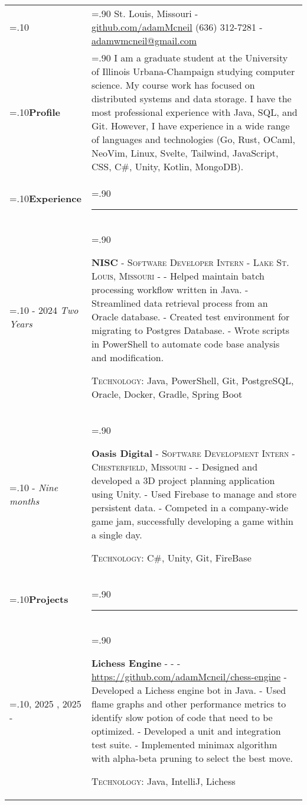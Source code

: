 \documentclass[10pt]{article}
\newcommand{\timeFrame}[3] {
  \if\relax\detokenize{#2}\relax
    #1
  \else
    #1 - #2
  \fi
  \newline
  \scriptsize \textit{#3}
}
\newcommand{\entry}[6] {
  \textbf{#1}
  \if\relax\detokenize{#2}\relax
  \else
       - \textsc{#2}
  \fi
  \if\relax\detokenize{#3}\relax
  \else
      - \textsc{#3}
  \fi
  \if\relax\detokenize{#4}\relax
  \else
      - \href{https://#4}{#4}
  \fi
  \newline #5
  \if\relax\detokenize{#6}\relax
  \else
      \newline \textsc{Technology:} #6
  \fi
  \\
}
\newcommand{\horizontalLine}[0] {
    \noindent\rule{.90\linewidth}{0.4pt}
}
\begin{document}

\begin{tabularx}{\linewidth}{>{\hsize=.10\hsize}X>{\hsize=.90\hsize}X}

{\bfseries\large Adam McNeil} &
St. Louis, Missouri - \href{https://github.com/adamMcneil}{github.com/adamMcneil}\newline
{(636) 312-7281 \hspace{5.5mm} - \href{mailto:adamwmcneil@gmail.com}{adamwmcneil@gmail.com}} \\[5pt]

\textbf{Profile} &
{
  I am a graduate student at the University of Illinois Urbana-Champaign studying computer science.
  My course work has focused on distributed systems and data storage.
  I have the most professional experience with Java, SQL, and Git.
  However, I have experience in a wide range of languages and technologies (Go, Rust, OCaml, NeoVim, Linux, Svelte, Tailwind, JavaScript, CSS, C\#, Unity, Kotlin, MongoDB).
 \newline
} \\

\textbf{Experience} & \horizontalLine \\

\timeFrame{2023}{2024}{Two Years} &
\entry{NISC}
  {Software Developer Intern}
  {Lake St. Louis, Missouri}
  {}
  {
  - Helped maintain batch processing workflow written in Java. \newline
  - Streamlined data retrieval process from an Oracle database. \newline
  - Created test environment for migrating to Postgres Database. \newline
  - Wrote scripts in PowerShell to automate code base analysis and modification.
  }
  {Java, PowerShell, Git, PostgreSQL, Oracle, Docker, Gradle, Spring Boot \newline}

\timeFrame{2022}{}{Nine months} &
\entry{Oasis Digital}
  {Software Development Intern}
  {Chesterfield, Missouri}
  {}
  {
  - Designed and developed a 3D project planning application using Unity. \newline
  - Used Firebase to manage and store persistent data. \newline
  - Competed in a company-wide game jam, successfully developing a game within a single day.
  }
  {C\#, Unity, Git, FireBase}


\textbf{Projects} & \horizontalLine \\
\timeFrame{2021, 2025}{}{} &
\entry{Lichess Engine}
  {}
  {}
  {https://github.com/adamMcneil/chess-engine}
  {
    - Developed a Lichess engine bot in Java. \newline
    - Used flame graphs and other performance metrics to identify slow potion of code that need to be optimized. \newline
    - Developed a unit and integration test suite. \newline
    - Implemented minimax algorithm with alpha-beta pruning to select the best move.
  }
  {Java, IntelliJ, Lichess \newline}


\end{tabularx}
\end{document}
